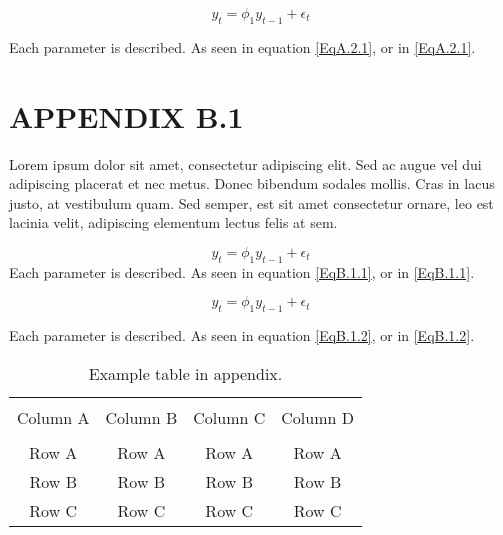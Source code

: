 \begin{equation}
y_{t} = \phi_{1} y_{t-1} + \epsilon_{t}
\label{EqA.2.1}
\end{equation}

Each parameter is described. As seen in equation \eqref{EqA.2.1}, or in \ref{EqA.2.1}.

\newpage

\chapter{APPENDIX B.1}
\renewcommand{\theequation}{B.1.\arabic{equation}}
\setcounter{equation}{0}

Lorem ipsum dolor sit amet, consectetur adipiscing elit. Sed ac augue vel dui adipiscing placerat et nec metus. Donec bibendum sodales mollis. Cras in lacus justo, at vestibulum quam. Sed semper, est sit amet consectetur ornare, leo est lacinia velit, adipiscing elementum lectus felis at sem.

\begin{equation}
y_{t} = \phi_{1} y_{t-1} + \epsilon_{t}
\label{EqB.1.1}
\end{equation}
Each parameter is described. As seen in equation \eqref{EqB.1.1}, or in \ref{EqB.1.1}.

\begin{equation}
y_{t} = \phi_{1} y_{t-1} + \epsilon_{t}
\label{EqB.1.2}
\end{equation}

Each parameter is described. As seen in equation \eqref{EqB.1.2}, or in \ref{EqB.1.2}.

\begin{table*}[!ht]
	{\setlength{\tabcolsep}{14pt}
		\caption{Example table in appendix.}
		\begin{center}
			\vspace{-6mm}
			\begin{tabular}{cccc}
				\hline \\[-2.45ex] \hline \\[-2.1ex]
				Column A & Column B & Column C & Column D \\
				\hline \\[-1.8ex]
				Row A & Row A & Row A & Row A \\
				Row B & Row B & Row B & Row B \\
				Row C & Row C & Row C & Row C \\
				[-0ex] \hline
			\end{tabular}
			\vspace{-6mm}
		\end{center}
		\label{TableB.1}}
\end{table*}

